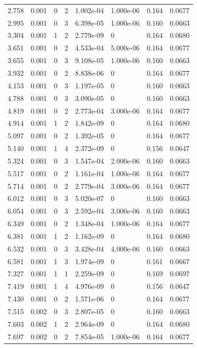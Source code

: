 \documentclass[preview]{standalone}
\begin{document}
{{\begin{tabular}{L{1.2cm}C{1.2cm} C{0.3cm}C{0.5cm} C{1.4cm}C{1.4cm} C{1.4cm}C{1.4cm}}
  2.758  &  0.001  & 0     &  2 &  1.002e-04  & 1.000e-06  & 0.164 &  0.0677   \\ 
  2.995  &  0.001  & 0     &  3 &  6.398e-05  & 1.000e-06  & 0.160 &  0.0663   \\ 
  3.304  &  0.001  & 1     &  2 &  2.779e-09  & 0  & 0.164 &  0.0680   \\ 
  3.651  &  0.001  & 0     &  2 &  4.533e-04  & 5.000e-06  & 0.164 &  0.0677   \\ 
  3.655  &  0.001  & 0     &  3 &  9.108e-05  & 1.000e-06  & 0.160 &  0.0663   \\ 
  3.932  &  0.001  & 0     &  2 &  8.838e-06  & 0  & 0.164 &  0.0677   \\ 
  4.153  &  0.001  & 0     &  3 &  1.197e-05  & 0  & 0.160 &  0.0663   \\ 
  4.788  &  0.001  & 0     &  3 &  3.090e-05  & 0  & 0.160 &  0.0663   \\ 
  4.819  &  0.001  & 0     &  2 &  2.773e-04  & 3.000e-06  & 0.164 &  0.0677   \\ 
  4.914  &  0.001  & 1     &  2 &  1.842e-09  & 0  & 0.164 &  0.0680   \\ 
  5.097  &  0.001  & 0     &  2 &  1.392e-05  & 0  & 0.164 &  0.0677   \\ 
  5.140  &  0.001  & 1     &  4 &  2.372e-09  & 0  & 0.156 &  0.0647   \\ 
  5.324  &  0.001  & 0     &  3 &  1.547e-04  & 2.000e-06  & 0.160 &  0.0663   \\ 
  5.517  &  0.001  & 0     &  2 &  1.161e-04  & 1.000e-06  & 0.164 &  0.0677   \\ 
  5.714  &  0.001  & 0     &  2 &  2.779e-04  & 3.000e-06  & 0.164 &  0.0677   \\ 
  6.012  &  0.001  & 0     &  3 &  5.020e-07  & 0  & 0.160 &  0.0663   \\ 
  6.054  &  0.001  & 0     &  3 &  2.592e-04  & 3.000e-06  & 0.160 &  0.0663   \\ 
  6.349  &  0.001  & 0     &  2 &  1.348e-04  & 1.000e-06  & 0.164 &  0.0677   \\ 
  6.381  &  0.001  & 1     &  2 &  1.162e-09  & 0  & 0.164 &  0.0680   \\ 
  6.532  &  0.001  & 0     &  3 &  3.428e-04  & 4.000e-06  & 0.160 &  0.0663   \\ 
  6.581  &  0.001  & 1     &  3 &  1.974e-09  & 0  & 0.161 &  0.0667   \\ 
  7.327  &  0.001  & 1     &  1 &  2.259e-09  & 0  & 0.169 &  0.0697   \\ 
  7.419  &  0.001  & 1     &  4 &  4.976e-09  & 0  & 0.156 &  0.0647   \\ 
  7.430  &  0.001  & 0     &  2 &  1.571e-06  & 0  & 0.164 &  0.0677   \\ 
  7.515  &  0.002  & 0     &  3 &  2.807e-05  & 0  & 0.160 &  0.0663   \\ 
  7.603  &  0.002  & 1     &  2 &  2.964e-09  & 0  & 0.164 &  0.0680   \\ 
  7.697  &  0.002  & 0     &  2 &  7.854e-05  & 1.000e-06  & 0.164 &  0.0677   \\ 
\hline 
\end{tabular} 

}}
\end{document}
